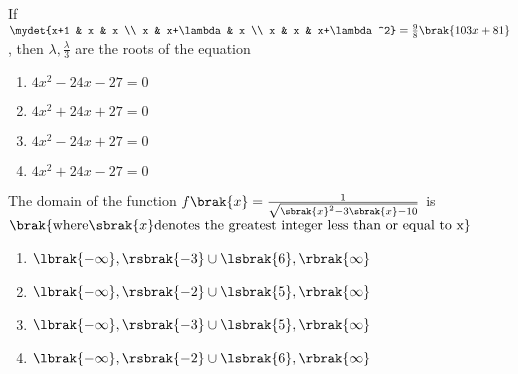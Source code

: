 \item If $\mydet{x+1 & x & x \\
	x & x+\lambda & x \\
	x & x & x+\lambda^2} = \frac{9}{8}\brak{103x+81}$, then $\lambda,\frac{\lambda}{3}$ are the roots of the equation
\begin{enumerate}
\item $4x^2-24x-27=0$         
\item $4x^2+24x+27=0$
\item $4x^2-24x+27=0$
\item $4x^2+24x-27=0$
\end{enumerate}

\item The domain of the function $f\brak{x}=\frac{1}{\sqrt{\sbrak{x}^2-3\sbrak{x}-10}}$ is $\brak{\text{where} \sbrak{x} \text{denotes the greatest integer less than or equal to x}}$
\begin{enumerate}
\item $\lbrak{-\infty},\rsbrak{-3} \cup \lsbrak{6},\rbrak{\infty}$             
\item $\lbrak{-\infty},\rsbrak{-2} \cup \lsbrak{5},\rbrak{\infty}$
\item $\lbrak{-\infty},\rsbrak{-3} \cup \lsbrak{5},\rbrak{\infty}$
\item $\lbrak{-\infty},\rsbrak{-2} \cup \lsbrak{6},\rbrak{\infty}$
\end{enumerate}
